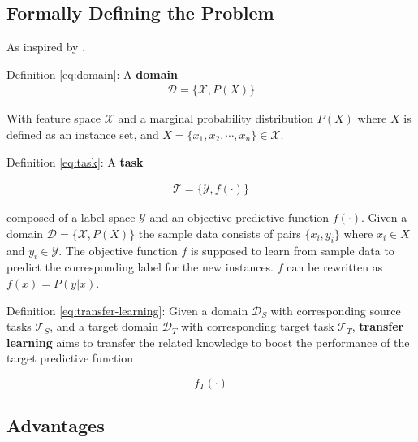 \documentclass[11pt]{article}
\begin{document}
\subsection{Formally Defining the Problem}

As inspired by \cite{concise-review-of-transfer-learning}.

Definition \ref{eq:domain}: A \textbf{domain} \begin{align}
    \mathcal{D} = \{\mathcal{X}, P(X)\}
    \label{eq:domain}
\end{align}

With feature space $\mathcal{X}$ and a marginal probability distribution $P(X)$ where $X$ is defined as an instance set, and $X = \{x_1, x_2, \cdots, x_n\} \in \mathcal{X}$.

\vspace{1em}

Definition \ref{eq:task}: A \textbf{task}

\begin{align}
    \mathcal{T} = \{\mathcal{Y}, f(\cdot)\}
    \label{eq:task}
\end{align}

composed of a label space $\mathcal{Y}$ and an objective predictive function $f(\cdot)$. Given a domain $\mathcal{D} = \{\mathcal{X}, P(X)\}$ the sample data consists of pairs $\{x_i, y_i\}$ where $x_i \in X$ and $y_i \in \mathcal{Y}$. The objective function $f$ is supposed to learn from sample data to predict the corresponding label for the new instances. $f$ can be rewritten as $f(x)=P(y|x)$.

\vspace{1em}

Definition \ref{eq:transfer-learning}: Given a domain $\mathcal{D}_S$ with corresponding source tasks $\mathcal{T}_S$, and a target domain $\mathcal{D}_T$ with corresponding target task $\mathcal{T}_T$, \textbf{transfer learning} aims to transfer the related knowledge to boost the performance of the target predictive function 

\begin{equation}
    f_T(\cdot)
    \label{eq:transfer-learning}
\end{equation}
    
\subsection{Advantages}
\end{document}
